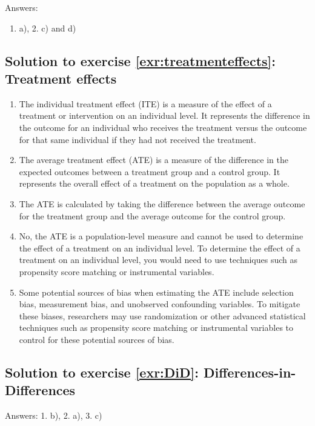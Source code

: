 \documentclass[
  12pt,
  oneside]{book}
\providecommand{\tightlist}{%
  \setlength{\itemsep}{0pt}\setlength{\parskip}{0pt}}
\theoremstyle{definition}
\theoremstyle{definition}
\theoremstyle{definition}
\theoremstyle{definition}
\theoremstyle{remark}
\begin{document}
Answers:

\begin{enumerate}
\def\labelenumi{\arabic{enumi}.}
\tightlist
\item
  a), 2. c) and d)
\end{enumerate}

\hypertarget{sol:treatmenteffects}{%
\subsection*{Solution to exercise \ref{exr:treatmenteffects}: Treatment effects}\label{sol:treatmenteffects}}

\begin{enumerate}
\def\labelenumi{\arabic{enumi}.}
\tightlist
\item
  The individual treatment effect (ITE) is a measure of the effect of a treatment or intervention on an individual level. It represents the difference in the outcome for an individual who receives the treatment versus the outcome for that same individual if they had not received the treatment.
\item
  The average treatment effect (ATE) is a measure of the difference in the expected outcomes between a treatment group and a control group. It represents the overall effect of a treatment on the population as a whole.
\item
  The ATE is calculated by taking the difference between the average outcome for the treatment group and the average outcome for the control group.
\item
  No, the ATE is a population-level measure and cannot be used to determine the effect of a treatment on an individual level. To determine the effect of a treatment on an individual level, you would need to use techniques such as propensity score matching or instrumental variables.
\item
  Some potential sources of bias when estimating the ATE include selection bias, measurement bias, and unobserved confounding variables. To mitigate these biases, researchers may use randomization or other advanced statistical techniques such as propensity score matching or instrumental variables to control for these potential sources of bias.
\end{enumerate}

\hypertarget{sol:DiD}{%
\subsection*{Solution to exercise \ref{exr:DiD}: Differences-in-Differences}\label{sol:DiD}}

Answers: 1. b), 2. a), 3. c)

  
\end{document}
